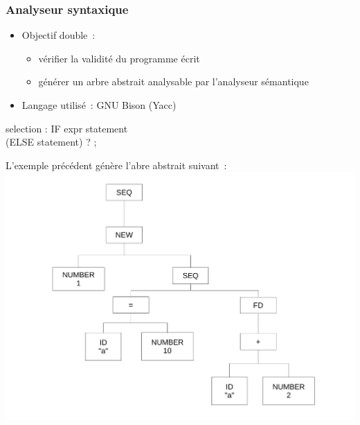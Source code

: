 \begin{frame}
	\frametitle{Analyseur syntaxique}
	\begin{itemize}
	\item Objectif double~: 
		\begin{itemize}
		\item vérifier la validité du programme écrit
		\item générer un arbre abstrait analysable par l'analyseur sémantique
		\end{itemize}
	\item Langage utilisé~: GNU Bison (Yacc)
	\end{itemize}
\end{frame}

\begin{frame}[fragile]
	\begin{rail}
		selection : IF expr statement \\ (ELSE statement) ? ;
	\end{rail}
\end{frame}

\begin{frame}
L'exemple précédent génère l'abre abstrait suivant~:
\includegraphics[scale=0.3]{doc/Presentation/img/arbre.pdf}
\end{frame}
